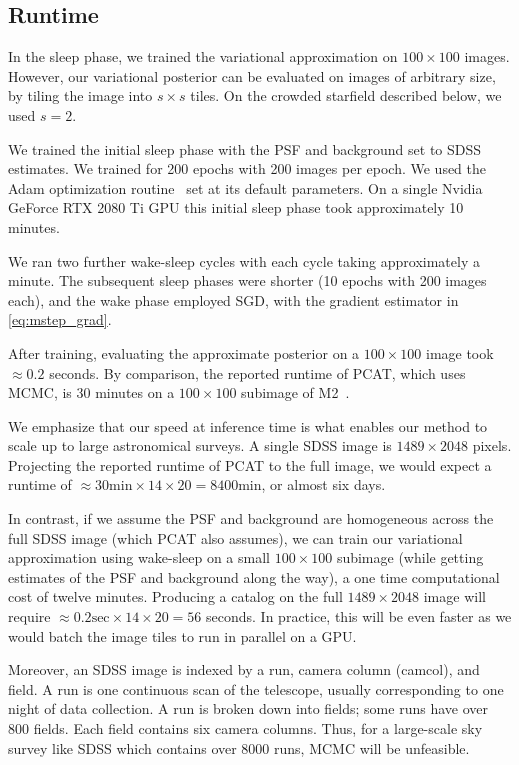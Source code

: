 \subsection{Runtime} 
\label{sec:runtime}
In the sleep phase, we trained the variational approximation on 
$100 \times 100$ images. However, our variational posterior can be evaluated on images of arbitrary size, by tiling the image into $s \times s$ tiles. On the crowded starfield described below, we used $s = 2$. 

We trained the initial sleep phase with the PSF and background set to SDSS estimates. We trained for 200 epochs with 200 images per epoch. We used 
the Adam optimization routine~\cite{kingma2014adam} set at its default parameters. On a single Nvidia GeForce RTX 2080 Ti GPU 
this initial sleep phase took approximately 10 minutes. 

We ran two further wake-sleep cycles with each cycle taking approximately a minute. The subsequent sleep phases were shorter (10 epochs with 200 images each), and the wake phase employed SGD, with the gradient estimator in \eqref{eq:mstep_grad}. 

After training, evaluating the approximate posterior on a $100 \times 100$ 
image took $\approx 0.2$ seconds. By comparison, the reported runtime of PCAT, which uses MCMC, is 30 minutes on a $100 \times 100$ subimage of M2~\cite{Feder_2019}. 

We emphasize that our speed at inference time is what enables our method to 
scale up to large astronomical surveys. A single SDSS image is $1489 \times 2048$ pixels. Projecting the reported runtime of PCAT to the full image, 
we would expect a runtime of 
$\approx 30\text{min} \times 14 \times 20 = 8400$min, or almost six days. 

In contrast, if we assume the PSF and background are homogeneous 
across the full SDSS image (which PCAT also assumes), we can 
train our variational approximation using wake-sleep 
on a small $100 \times 100$ subimage
(while getting estimates of the PSF and background along the way),
a one time computational cost of twelve minutes. 
Producing a catalog on the full $1489 \times 2048$ image will require 
$\approx 0.2\text{sec} \times 14 \times 20 = 56$ seconds. In practice, 
this will be even faster as we would batch the image tiles to run in parallel on a GPU. 

Moreover, an SDSS image is indexed by a run, camera column (camcol), and field.
A run is one continuous scan of the telescope, usually corresponding to one night of data collection. 
A run is broken down into fields; some runs have over 800 fields. 
Each field contains six camera columns. 
Thus, for a large-scale sky survey like SDSS which 
contains over 8000 runs, MCMC will be unfeasible. 


